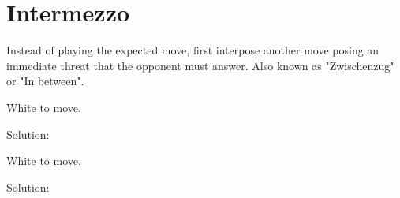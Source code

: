 \documentclass{book}
\begin{document}
\section{Intermezzo}
Instead of playing the expected move, first interpose another move posing an immediate threat that the opponent must answer. Also known as "Zwischenzug" or "In between".\begin{multicols}{2} 
\begin{samepage} 
\newgame 


 
\showboard
 
 White to move. 
 
Solution: 
 
\end{samepage}\begin{samepage} 
\newgame 


 
\showboard
 
 White to move. 
 
Solution: 
 
\end{samepage}\end{multicols} 
\newpage 
\end{document}
